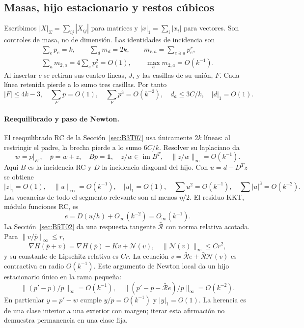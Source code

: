 \subsection{Masas, hijo estacionario y restos cúbicos}\label{sec:B5T03}
Escribimos $|X|_\Sigma=\sum_{ij}|X_{ij}|$ para matrices y
$|x|_1=\sum_i|x_i|$ para vectores. Son controles de masa, no de dimensión.
Las identidades de incidencia son
\[
 \begin{gathered}
 \sum_ep_e=k,\qquad\sum_d m_d=2k,\qquad
 m_{r,a}=\sum_{e\ni a}p_e^r,\\
 \sum_a m_{2,a}=4\sum_ep_e^2=O(1),\qquad
 \max_a m_{2,a}=O(k^{-1}).
 \end{gathered}
\]
Al insertar $c$ se retiran sus cuatro líneas, $J$, y las casillas de su unión, $F$.
Cada línea retenida pierde a lo sumo tres casillas. Por tanto
\[
 |F|\le4k-3,\quad\sum_Fp=O(1),\quad\sum_Fp^3=O(k^{-2}),
 \quad d_a\le3C/k,\quad |d|_1=O(1).
\]

\paragraph{Reequilibrado y paso de Newton.}
El reequilibrado RC de la Sección~\ref{sec:B3T07} usa únicamente $2k$ líneas: al restringir
el padre, la brecha pierde a lo sumo $6C/k$. Resolver su laplaciano da
\[
 w=p|_{E'},\quad\bar p=w+z,\quad B\bar p=\mathbf1,
 \quad z/w\in\operatorname{im}B^T,\quad\|z/w\|_\infty=O(k^{-1}).
\]
Aquí $B$ es la incidencia RC y $D$ la incidencia diagonal del hijo.
Con $u=d-D^Tz$ se obtiene
\[
 |z|_1=O(1),\quad\|u\|_\infty=O(k^{-1}),\quad|u|_1=O(1),
 \quad\sum u^2=O(k^{-1}),\quad\sum|u|^3=O(k^{-2}).
\]
Las vacancias de todo el segmento relevante son al menos $\eta/2$.
El residuo KKT, módulo funciones RC, es
\[
 e=D(u/h)+O_\infty(k^{-2})=O_\infty(k^{-1}).
\]
La Sección~\ref{sec:B5T02} da una respuesta tangente $\bar{\mathcal R}$ con norma relativa acotada.
Para $\|v/\bar p\|_\infty\le r$,
\[
 \nabla H(\bar p+v)=\nabla H(\bar p)-Kv+\mathcal N(v),\quad
 \|\mathcal N(v)\|_\infty\le Cr^2,
\]
y su constante de Lipschitz relativa es $Cr$.
La ecuación $v=\bar{\mathcal R}e+\bar{\mathcal R}\mathcal N(v)$
es contractiva en radio $O(k^{-1})$. Este argumento de Newton local da un hijo estacionario único
en la rama pequeña:
\[
 \|(p'-\bar p)/\bar p\|_\infty=O(k^{-1}),\quad
 \|(p'-\bar p-\bar{\mathcal R}e)/\bar p\|_\infty=O(k^{-2}).
\]
En particular $y=p'-w$ cumple $y/p=O(k^{-1})$ y $|y|_1=O(1)$.
La herencia es de una clase interior a una exterior con margen;
iterar esta afirmación no demuestra permanencia en una clase fija.

